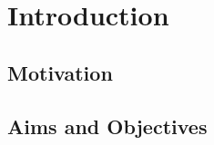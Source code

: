 \def\baselinestretch{1}

\chapter{Introduction}

\def\baselinestretch{1.66}




\smallskip

\goodbreak
\section{Motivation}

\bigskip

\goodbreak

\section{Aims and Objectives}




